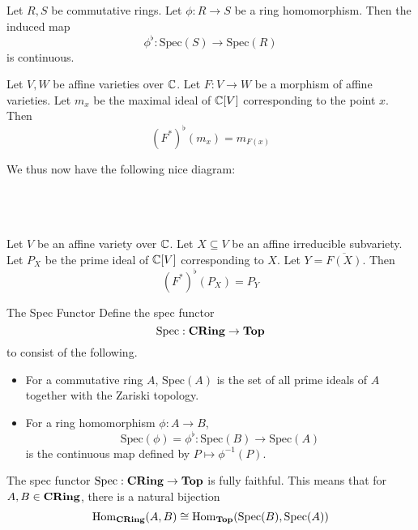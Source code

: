 \documentclass[a4paper]{article}
\begin{document}
\begin{lmm}{}{}  Let $R,S$ be commutative rings. Let $\phi:R\to S$ be a ring homomorphism.  Then the induced map $$\phi^\flat:\text{Spec}(S)\to\text{Spec}(R)$$ is continuous. 
\end{lmm}

\begin{prp}{}{} Let $V,W$ be affine varieties over $\mathbb{C}$. Let $F:V\to W$ be a morphism of affine varieties. Let $m_x$ be the maximal ideal of $\mathbb{C}[V]$ corresponding to the point $x$. Then $$(F^\ast)^\flat(m_x)=m_{F(x)}$$
\end{prp}

We thus now have the following nice diagram: \\~\\
\\~\\

\begin{prp}{}{} Let $V$ be an affine variety over $\mathbb{C}$. Let $X\subseteq V$ be an affine irreducible subvariety. Let $P_X$ be the prime ideal of $\mathbb{C}[V]$ corresponding to $X$. Let $Y=\overline{F(X)}$. Then $$(F^\ast)^\flat(P_X)=P_Y$$
\end{prp}

\begin{defn}{The Spec Functor}{} Define the spec functor $$\text{Spec}:\bold{CRing}\to\bold{Top}$$ to consist of the following. 
\begin{itemize}
\item For a commutative ring $A$, $\text{Spec}(A)$ is the set of all prime ideals of $A$ together with the Zariski topology. 
\item For a ring homomorphism $\phi:A\to B$, $$\text{Spec}(\phi)=\phi^\flat:\text{Spec}(B)\to\text{Spec}(A)$$ is the continuous map defined by $P\mapsto\phi^{-1}(P)$. 
\end{itemize}
\end{defn}

\begin{prp}{}{} The spec functor $\text{Spec}:\bold{CRing}\to\bold{Top}$ is fully faithful. This means that for $A,B\in\bold{CRing}$, there is a natural bijection $$\operatorname{Hom}_\bold{CRing}(A,B)\cong\operatorname{Hom}_\bold{Top}(\text{Spec}(B),\text{Spec}(A))$$
\end{prp}
\end{document}
